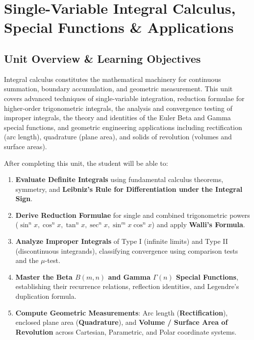 \chapter{Single-Variable Integral Calculus, Special Functions \& Applications}
\label{chap:single-variable-integral-calculus}

\section{Unit Overview \& Learning Objectives}

Integral calculus constitutes the mathematical machinery for continuous summation, boundary accumulation, and geometric measurement. This unit covers advanced techniques of single-variable integration, reduction formulae for higher-order trigonometric integrals, the analysis and convergence testing of improper integrals, the theory and identities of the Euler Beta and Gamma special functions, and geometric engineering applications including rectification (arc length), quadrature (plane area), and solids of revolution (volumes and surface areas).

\begin{important}
After completing this unit, the student will be able to:
\begin{enumerate}[leftmargin=1.5em]
    \item \textbf{Evaluate Definite Integrals} using fundamental calculus theorems, symmetry, and \textbf{Leibniz's Rule for Differentiation under the Integral Sign}.
    \item \textbf{Derive Reduction Formulae} for single and combined trigonometric powers ($\sin^n x, \cos^n x, \tan^n x, \sec^n x, \sin^m x \cos^n x$) and apply \textbf{Walli's Formula}.
    \item \textbf{Analyze Improper Integrals} of Type I (infinite limits) and Type II (discontinuous integrands), classifying convergence using comparison tests and the $\mu$-test.
    \item \textbf{Master the Beta $B(m,n)$ and Gamma $\Gamma(n)$ Special Functions}, establishing their recurrence relations, reflection identities, and Legendre's duplication formula.
    \item \textbf{Compute Geometric Measurements}: Arc length (\textbf{Rectification}), enclosed plane area (\textbf{Quadrature}), and \textbf{Volume / Surface Area of Revolution} across Cartesian, Parametric, and Polar coordinate systems.
\end{enumerate}
\end{important}

